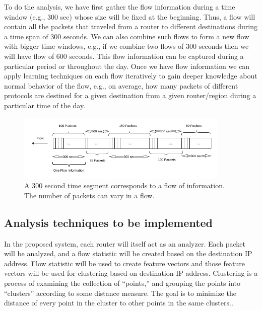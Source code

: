 \documentclass[12pt,oneside,a4paper]{article}
\begin{document}
To do the analysis, we have first gather the flow information during a time window (e.g., 300 sec) whose size will be fixed at the beginning. Thus, a flow will contain all the packets that traveled from a router to different destinations during a time span of 300 seconds. We can also combine such flows to form a new flow with bigger time windows, e.g., if we combine two flows of 300 seconds then we will have flow of 600 seconds. This flow information can be captured during a particular period or throughout the day. Once we have flow information we can apply learning techniques on each flow iteratively to gain deeper knowledge about normal behavior of the flow, e.g., on average, how many packets of different protocols are destined for a given destination from a given router/region during a particular time of the day.

\begin{figure}[H]
\centering
\includegraphics[width=0.90\textwidth]{Data_Flow_Capture.png}
\caption{A 300 second time segment corresponds to a flow of information. The number of packets can vary in a flow.} \label{fig:flow}
\end{figure}

\subsection{Analysis techniques to be implemented}
In the proposed system, each router will itself act as an analyzer. Each packet will be analyzed, and a flow statistic will be created based on the destination IP address. Flow statistic will be used to create feature vectors and those feature vectors will be used for clustering based on destination IP address. Clustering is a process of examining the collection of “points,” and grouping the points into “clusters” according to some distance measure. The goal is to minimize the distance of every point in the cluster to other points in the same clusters.\cite{machine-learning}.
\end{document}
